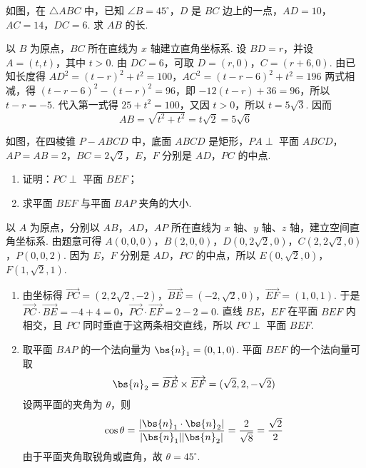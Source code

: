 \begin{problem}
如图，在 \(\triangle ABC\) 中，已知 \(\angle B = 45^{\circ}\)，\(D\) 是 \(BC\) 边上的一点，\(AD = 10\)，\(AC = 14\)，\(DC = 6\). 求 \(AB\) 的长.

\end{problem}

\begin{solution}
以 \(B\) 为原点，\(BC\) 所在直线为 \(x\) 轴建立直角坐标系. 设 \(BD=r\)，并设 \(A=(t,t)\)，其中 \(t>0\). 由 \(DC=6\)，可取 \(D=(r,0)\)，\(C=(r+6,0)\). 由已知长度得
\(AD^2=(t-r)^2+t^2=100\)，\(AC^2=(t-r-6)^2+t^2=196\)
两式相减，得 \((t-r-6)^2-(t-r)^2=96\)，即 \(-12(t-r)+36=96\)，所以 \(t-r=-5\). 代入第一式得 \(25+t^2=100\)，又因 \(t>0\)，所以 \(t=5\sqrt{3}\). 因而
\[
AB=\sqrt{t^2+t^2}=t\sqrt{2}=5\sqrt{6}
\]
\end{solution}

\begin{problem}
如图，在四棱锥 \(P - ABCD\) 中，底面 \(ABCD\) 是矩形，\(PA \perp\) 平面 \(ABCD\)，\(AP = AB = 2\)，\(BC = 2\sqrt{2}\)，\(E\)，\(F\) 分别是 \(AD\)，\(PC\) 的中点.

\begin{enumerate}
\item 证明：\(PC \perp\) 平面 \(BEF\)；
\item 求平面 \(BEF\) 与平面 \(BAP\) 夹角的大小.
\end{enumerate}

\end{problem}

\begin{solution}
以 \(A\) 为原点，分别以 \(AB\)，\(AD\)，\(AP\) 所在直线为 \(x\) 轴、\(y\) 轴、\(z\) 轴，建立空间直角坐标系. 由题意可得
\(A(0,0,0)\)，\(B(2,0,0)\)，\(D(0,2\sqrt{2},0)\)，\(C(2,2\sqrt{2},0)\)，\(P(0,0,2)\).
因为 \(E\)，\(F\) 分别是 \(AD\)，\(PC\) 的中点，所以
\(E(0,\sqrt{2},0)\)，\(F(1,\sqrt{2},1)\).
\begin{enumerate}
\item 由坐标得 \(\overrightarrow{PC}=(2,2\sqrt{2},-2)\)，\(\overrightarrow{BE}=(-2,\sqrt{2},0)\)，\(\overrightarrow{EF}=(1,0,1)\). 于是 \(\overrightarrow{PC}\cdot\overrightarrow{BE}=-4+4=0\)，\(\overrightarrow{PC}\cdot\overrightarrow{EF}=2-2=0\).
直线 \(BE\)，\(EF\) 在平面 \(BEF\) 内相交，且 \(PC\) 同时垂直于这两条相交直线，所以 \(PC\perp\) 平面 \(BEF\).
\item 取平面 \(BAP\) 的一个法向量为 \(\bs{n}_1=(0,1,0)\). 平面 \(BEF\) 的一个法向量可取
\[
\bs{n}_2=\overrightarrow{BE}\times\overrightarrow{EF}=(\sqrt{2},2,-\sqrt{2})
\]
设两平面的夹角为 \(\theta\)，则
\[
\cos\theta=\frac{|\bs{n}_1\cdot\bs{n}_2|}{|\bs{n}_1||\bs{n}_2|}=\frac{2}{\sqrt{8}}=\frac{\sqrt{2}}{2}
\]
由于平面夹角取锐角或直角，故 \(\theta=45^{\circ}\).
\end{enumerate}
\end{solution}

